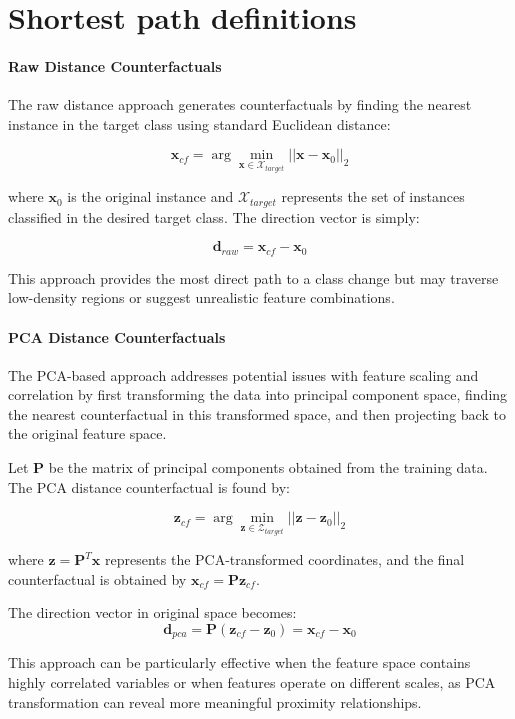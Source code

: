 \documentclass[sigconf,anonymous]{aamas}
\begin{document}
\section{Shortest path definitions}
\paragraph{Raw Distance Counterfactuals}
The raw distance approach generates counterfactuals by finding the nearest instance in the target class using standard Euclidean distance:

\begin{equation}
\mathbf{x}_{cf} = \arg\min_{\mathbf{x} \in \mathcal{X}_{target}} ||\mathbf{x} - \mathbf{x}_0||_2
\end{equation}

where \( \mathbf{x}_0 \) is the original instance and \( \mathcal{X}_{target} \) represents the set of instances classified in the desired target class. The direction vector is simply:

\begin{equation}
\mathbf{d}_{raw} = \mathbf{x}_{cf} - \mathbf{x}_0
\end{equation}

This approach provides the most direct path to a class change but may traverse low-density regions or suggest unrealistic feature combinations.

\paragraph{PCA Distance Counterfactuals}
The PCA-based approach addresses potential issues with feature scaling and correlation by first transforming the data into principal component space, finding the nearest counterfactual in this transformed space, and then projecting back to the original feature space.

Let \( \mathbf{P} \) be the matrix of principal components obtained from the training data. The PCA distance counterfactual is found by:

\begin{equation}
\mathbf{z}_{cf} = \arg\min_{\mathbf{z} \in \mathcal{Z}_{target}} ||\mathbf{z} - \mathbf{z}_0||_2
\end{equation}

where \( \mathbf{z} = \mathbf{P}^T\mathbf{x} \) represents the PCA-transformed coordinates, and the final counterfactual is obtained by \( \mathbf{x}_{cf} = \mathbf{P}\mathbf{z}_{cf} \).

The direction vector in original space becomes:
\begin{equation}
\mathbf{d}_{pca} = \mathbf{P}(\mathbf{z}_{cf} - \mathbf{z}_0) = \mathbf{x}_{cf} - \mathbf{x}_0
\end{equation}

This approach can be particularly effective when the feature space contains highly correlated variables or when features operate on different scales, as PCA transformation can reveal more meaningful proximity relationships.
\end{document}
